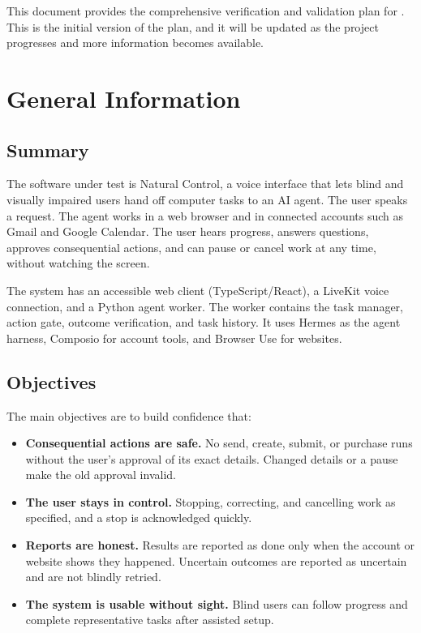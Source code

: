 \documentclass[12pt, titlepage]{article}
\begin{document}
This document provides the comprehensive verification and validation plan for \progname{}.
This is the initial version of the plan, and it will be updated as the project progresses and more information becomes available.

\section{General Information}

\subsection{Summary}

The software under test is Natural Control, a voice interface that lets blind
and visually impaired users hand off computer tasks to an AI agent. The user
speaks a request. The agent works in a web browser and in connected accounts
such as Gmail and Google Calendar. The user hears progress, answers questions,
approves consequential actions, and can pause or cancel work at any time,
without watching the screen.

The system has an accessible web client (TypeScript/React), a LiveKit voice
connection, and a Python agent worker. The worker contains the task manager,
action gate, outcome verification, and task history. It uses Hermes as the
agent harness, Composio for account tools, and Browser Use for websites.

\subsection{Objectives}

The main objectives are to build confidence that:
\begin{itemize}
  \item \textbf{Consequential actions are safe.} No send, create, submit, or
  purchase runs without the user's approval of its exact details. Changed
  details or a pause make the old approval invalid.
  \item \textbf{The user stays in control.} Stopping, correcting, and cancelling
  work as specified, and a stop is acknowledged quickly.
  \item \textbf{Reports are honest.} Results are reported as done only when the
  account or website shows they happened. Uncertain outcomes are reported as
  uncertain and are not blindly retried.
  \item \textbf{The system is usable without sight.} Blind users can follow
  progress and complete representative tasks after assisted setup.
\end{itemize}
\end{document}
